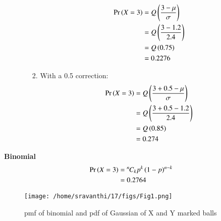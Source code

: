 \documentclass[journal,12pt,twocolumn]{IEEEtran}
\theoremstyle{remark}
\begin{document}
\begin{enumerate}[label=(\roman*)]
\begin{enumerate}[label=(\alph*)]
\begin{enumerate}
\begin{align}
\Pr\left(X =3\right) &= Q\left(\frac{3-\mu}{\sigma}\right) \\
&= Q\left(\frac{3-1.2}{2.4}\right) \\
&= Q\left(0.75\right) \\
& = 0.2276
\end{align}
\item With a 0.5 correction:
\begin{align}
\Pr\left(X =3\right)&= Q\left(\frac{3+0.5-\mu}{\sigma}\right) \\
 &= Q\left(\frac{3+0.5-1.2}{2.4}\right)\\
 &= Q\left(0.85\right) \\
& = 0.274 
\end{align}
\end{enumerate}
\end{enumerate}
\end{enumerate}
\textbf{Binomial}
\begin{align}
\Pr\left(X=3\right) 
&= {{}^{n}\mkern-1muC_{k}}p^k\left(1-p\right)^{n-k} \\
&= 0.2764
\end{align}
\begin{figure}
\texttt{[image: /home/sravanthi/17/figs/Fig1.png]}
\caption{pmf of binomial and pdf of Gaussian of X and Y marked balls}
\label{fig:gaussian/9/3/17/}
\end{figure}
\end{document}
